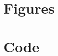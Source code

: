 \documentclass[12pt]{article}
\begin{document}
	\clearpage
	
	\section{Figures} \label{sec:fig}
	
	
	
	
	
	\clearpage
	
	\section{Code} \label{sec:code}
	
	
	
	
	
	\clearpage
	
	
\end{document}
